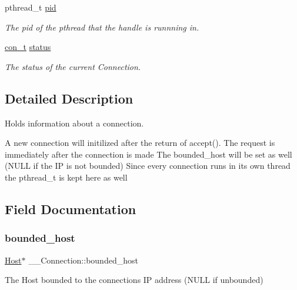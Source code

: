 \begin{DoxyCompactItemize}
pthread\+\_\+t \mbox{\hyperlink{struct_____connection_a14f7aa2d4815a0292b0e0579ea3ffec3}{pid}}
\begin{DoxyCompactList}\small\item\em The pid of the pthread that the handle is runnning in. \end{DoxyCompactList}\item 
\mbox{\hyperlink{server_8h_adff1af7110b02fbef1d43e5a4b638ee8}{con\+\_\+t}} \mbox{\hyperlink{struct_____connection_ab68ce7496aed662e1431a1c29d7c2a10}{status}}
\begin{DoxyCompactList}\small\item\em The status of the current Connection. \end{DoxyCompactList}\end{DoxyCompactItemize}


\subsection{Detailed Description}
Holds information about a connection. 

A new connection will initilized after the return of accept(). The request is immediately after the connection is made The bounded\+\_\+host will be set as well (N\+U\+LL if the IP is not bounded) Since every connection runs in its own thread the pthread\+\_\+t is kept here as well 

\subsection{Field Documentation}
\mbox{\label{struct_____connection_a141d30c3e0a43c1a460797bfd4e4d581}} 
\subsubsection{\texorpdfstring{bounded\+\_\+host}{bounded\_host}}
{\footnotesize\ttfamily \mbox{\hyperlink{host_8h_a30ca67c0ed1f344be0c570271ecfc489}{Host}}$\ast$ \+\_\+\+\_\+\+Connection\+::bounded\+\_\+host}



The Host bounded to the connections IP address (N\+U\+LL if unbounded) 

\mbox{\label{struct_____connection_a49433c1edd3dd2f86a724047f9de2414}} 
